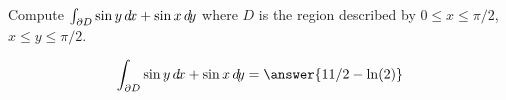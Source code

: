 \documentclass{ximera}
\author{David Guichard \and Neal Koblitz \and H. Jerome Keisler \and Albert Scheller \and Barry Balof \and Mike Wills \and Matthew Carr}
\begin{document}
\begin{exercise}




Compute $\int_{\partial D}\sin y\mathop{}\!d\! x+\sin x \mathop{}\!d\! y$ where $D$ is the region described by $0\le x\le \pi/2$, $x\le y\le \pi/2$. 
 

\begin{prompt}
\[
\int_{\partial D}\sin y\d x+\sin x\d y=\answer{11/2-\ln(2)}
\]
\end{prompt}

\end{exercise}
\end{document}
